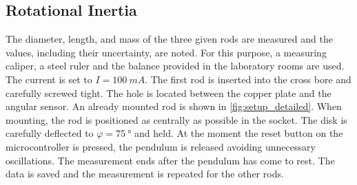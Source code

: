         \subsection{Rotational Inertia}
            The diameter, length, and mass of the three given rods are measured and the values, including their uncertainty, are noted.
            For this purpose, a measuring caliper, a steel ruler and the balance provided in the laboratory rooms are used. The current
            is set to \(I = \SI{100}{mA}\). The first rod is inserted into the cross bore and carefully screwed tight. The hole is
            located between the copper plate and the angular sensor. An already mounted rod is shown in \cref{fig:setup_detailed}. When
            mounting, the rod is positioned as centrally as possible in the socket. The disk is carefully deflected to
            \(\varphi = \SI{75}{\degree}\) and held. At the moment the reset button on the microcontroller is pressed, the pendulum
            is released avoiding unnecessary oscillations. The measurement ends after the pendulum has come to rest. The data is saved
            and the measurement is repeated for the other rods.